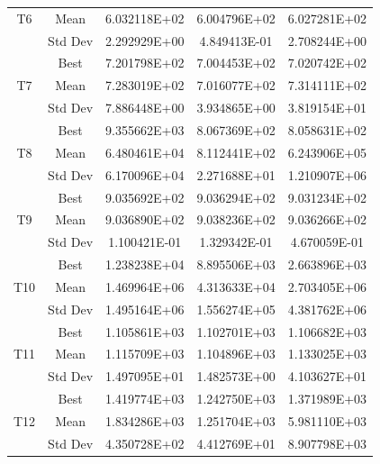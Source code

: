 \documentclass[letterpaper]{article}
\begin{document}
\begin{center}
\begin{table}[htbp]
\begin{center}
{\begin{tabular}{|c|c|c|c|c|}
				\multicolumn{ 1}{|c|}{T6} & Mean & 6.032118E+02 & 6.004796E+02 & 6.027281E+02 \\ \cline{ 2- 5}
				\multicolumn{ 1}{|c|}{} & Std Dev & 2.292929E+00 & 4.849413E-01 & 2.708244E+00 \\ \hline
				\multicolumn{ 1}{|c|}{} & Best & 7.201798E+02 & 7.004453E+02 & 7.020742E+02 \\ \cline{ 2- 5}
				\multicolumn{ 1}{|c|}{T7} & Mean & 7.283019E+02 & 7.016077E+02 & 7.314111E+02 \\ \cline{ 2- 5}
				\multicolumn{ 1}{|c|}{} & Std Dev & 7.886448E+00 & 3.934865E+00 & 3.819154E+01 \\ \hline
				\multicolumn{ 1}{|c|}{} & Best & 9.355662E+03 & 8.067369E+02 & 8.058631E+02 \\ \cline{ 2- 5}
				\multicolumn{ 1}{|c|}{T8} & Mean & 6.480461E+04 & 8.112441E+02 & 6.243906E+05 \\ \cline{ 2- 5}
				\multicolumn{ 1}{|c|}{} & Std Dev & 6.170096E+04 & 2.271688E+01 & 1.210907E+06 \\ \hline
				\multicolumn{ 1}{|c|}{} & Best & 9.035692E+02 & 9.036294E+02 & 9.031234E+02 \\ \cline{ 2- 5}
				\multicolumn{ 1}{|c|}{T9} & Mean & 9.036890E+02 & 9.038236E+02 & 9.036266E+02 \\ \cline{ 2- 5}
				\multicolumn{ 1}{|c|}{} & Std Dev & 1.100421E-01 & 1.329342E-01 & 4.670059E-01 \\ \hline
				\multicolumn{ 1}{|c|}{} & Best & 1.238238E+04 & 8.895506E+03 & 2.663896E+03 \\ \cline{ 2- 5}
				\multicolumn{ 1}{|c|}{T10} & Mean & 1.469964E+06 & 4.313633E+04 & 2.703405E+06 \\ \cline{ 2- 5}
				\multicolumn{ 1}{|c|}{} & Std Dev & 1.495164E+06 & 1.556274E+05 & 4.381762E+06 \\ \hline
				\multicolumn{ 1}{|c|}{} & Best & 1.105861E+03 & 1.102701E+03 & 1.106682E+03 \\ \cline{ 2- 5}
				\multicolumn{ 1}{|c|}{T11} & Mean & 1.115709E+03 & 1.104896E+03 & 1.133025E+03 \\ \cline{ 2- 5}
				\multicolumn{ 1}{|c|}{} & Std Dev & 1.497095E+01 & 1.482573E+00 & 4.103627E+01 \\ \hline
				\multicolumn{ 1}{|c|}{} & Best & 1.419774E+03 & 1.242750E+03 & 1.371989E+03 \\ \cline{ 2- 5}
				\multicolumn{ 1}{|c|}{T12} & Mean & 1.834286E+03 & 1.251704E+03 & 5.981110E+03 \\ \cline{ 2- 5}
				\multicolumn{ 1}{|c|}{} & Std Dev & 4.350728E+02 & 4.412769E+01 & 8.907798E+03 \\ \hline

\end{tabular}}
\end{center}
\end{table}
\end{center}
\end{document}
